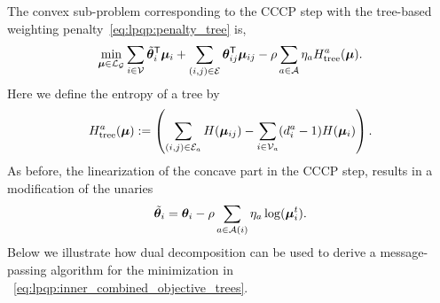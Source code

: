 The convex sub-problem corresponding to the \ac{CCCP} step with the 
tree-based weighting penalty~\eqref{eq:lpqp:penalty_tree} is, 
\begin{equation}
    \min_{\bm{\mu}\in\mathcal{L}_{\mathcal{G}}} \sum_{i\in\mathcal{V}}
    \tilde{\bm{\theta}}_{i}^{\mathsf{T}}\bm{\mu}_{i} 
    + \sum_{(i,j) \in \mathcal{E}} \bm{\theta}_{ij}^{\mathsf{T}}
    \bm{\mu}_{ij}
    -\rho \sum_{a \in \mathcal{A}}  \eta_{a} H_{\text{tree}}^{a} (\bm{\mu}).
    \label{eq:lpqp:inner_combined_objective_trees}
\end{equation}
Here we define the entropy of a tree by
\[
    H_{\text{tree}}^{a}(\bm{\mu}) :=  \left ( 
        \sum_{(i,j) \in \mathcal{E}_a}H(\bm{\mu}_{ij}) -
         \sum_{i
        \in \mathcal{V}_a} (d_i^a-1)H(\bm{\mu}_{i})\right).
\]
As before, the linearization of the concave part in the \ac{CCCP} step, results in a
 modification of the unaries
\begin{equation}
 \tilde{\bm{\theta}}_{i} = \bm{\theta}_{i} -\rho \sum_{a \in \mathcal{A}(i)}
    \eta_{a}\log(\bm{\mu}^{t}_{i}).
\end{equation}
Below we illustrate how dual decomposition can be used to derive a
message-passing algorithm for the minimization in
~\eqref{eq:lpqp:inner_combined_objective_trees}.

